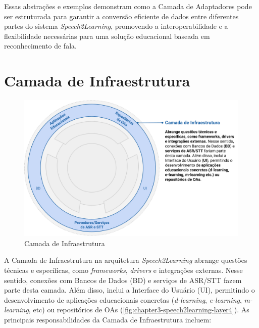 Essas abstrações e exemplos demonstram como a Camada de Adaptadores pode ser estruturada para garantir a conversão eficiente de dados entre diferentes partes do sistema \textit{Speech2Learning}, promovendo a interoperabilidade e a flexibilidade necessárias para uma solução educacional baseada em reconhecimento de fala.

\section{Camada de Infraestrutura}

\begin{figure}[htb]
\centering
\caption{Camada de Infraestrutura}
\label{fig:chapter3-speech2learning-layer4}
\includegraphics[width=1\textwidth]{images/chapter3-speech2learning-layer4.png}
\end{figure}

A Camada de Infraestrutura na arquitetura \textit{Speech2Learning} abrange questões técnicas e específicas, como \textit{frameworks}, \textit{drivers} e integrações externas. Nesse sentido, conexões com Bancos de Dados (BD) e serviços de ASR/STT fazem parte desta camada. Além disso, inclui a Interface do Usuário (UI), permitindo o desenvolvimento de aplicações educacionais concretas (\textit{d-learning}, \textit{e-learning}, \textit{m-learning}, etc) ou repositórios de OAs (\autoref{fig:chapter3-speech2learning-layer4}). As principais responsabilidades da Camada de Infraestrutura incluem:

